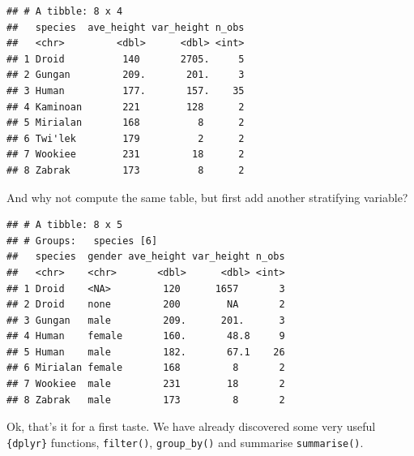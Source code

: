 \documentclass[]{gitbook}
\newenvironment{Shaded}{\begin{snugshade}}{\end{snugshade}}
\newcommand{\DataTypeTok}[1]{\textcolor[rgb]{0.13,0.29,0.53}{#1}}
\newcommand{\DecValTok}[1]{\textcolor[rgb]{0.00,0.00,0.81}{#1}}
\newcommand{\KeywordTok}[1]{\textcolor[rgb]{0.13,0.29,0.53}{\textbf{#1}}}
\newcommand{\NormalTok}[1]{#1}
\newcommand{\OperatorTok}[1]{\textcolor[rgb]{0.81,0.36,0.00}{\textbf{#1}}}
\newcommand{\OtherTok}[1]{\textcolor[rgb]{0.56,0.35,0.01}{#1}}
\newcommand{\StringTok}[1]{\textcolor[rgb]{0.31,0.60,0.02}{#1}}
\begin{document}
\begin{verbatim}
## # A tibble: 8 x 4
##   species  ave_height var_height n_obs
##   <chr>         <dbl>      <dbl> <int>
## 1 Droid          140       2705.     5
## 2 Gungan         209.       201.     3
## 3 Human          177.       157.    35
## 4 Kaminoan       221        128      2
## 5 Mirialan       168          8      2
## 6 Twi'lek        179          2      2
## 7 Wookiee        231         18      2
## 8 Zabrak         173          8      2
\end{verbatim}

And why not compute the same table, but first add another stratifying variable?

\begin{Shaded}
\end{Shaded}

\begin{verbatim}
## # A tibble: 8 x 5
## # Groups:   species [6]
##   species  gender ave_height var_height n_obs
##   <chr>    <chr>       <dbl>      <dbl> <int>
## 1 Droid    <NA>         120      1657       3
## 2 Droid    none         200        NA       2
## 3 Gungan   male         209.      201.      3
## 4 Human    female       160.       48.8     9
## 5 Human    male         182.       67.1    26
## 6 Mirialan female       168         8       2
## 7 Wookiee  male         231        18       2
## 8 Zabrak   male         173         8       2
\end{verbatim}

Ok, that's it for a first taste. We have already discovered some very useful \texttt{\{dplyr\}} functions,
\texttt{filter()}, \texttt{group\_by()} and summarise \texttt{summarise()}.
\end{document}
